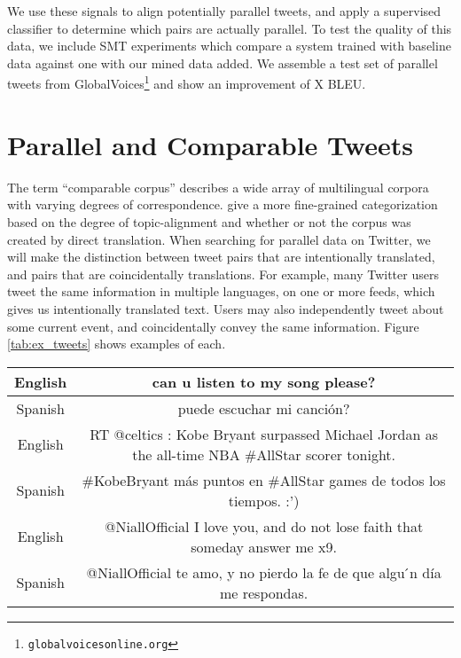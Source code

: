 We use these signals to align potentially parallel tweets, and apply a
supervised classifier \citep{Munteanu05} to determine which pairs are actually parallel.
To test the quality of this data, we include SMT experiments which compare a
system trained with baseline data against one with our mined data added. We
assemble a test set of parallel tweets from GlobalVoices\footnote{{\tt globalvoicesonline.org}}
and show an improvement of X BLEU.

\section{Parallel and Comparable Tweets}
The term ``comparable corpus'' describes a wide array of multilingual corpora with varying
degrees of correspondence. \citet{Fung04a} give a more fine-grained
categorization based on the degree of topic-alignment and whether or not the
corpus was created by direct translation. When searching for parallel data on
Twitter, we will make the distinction between tweet pairs that are intentionally
translated, and pairs that are coincidentally translations. For example, many
Twitter users tweet the same information in multiple languages, on one or more
feeds, which gives us intentionally translated text. Users may also
independently tweet about some current event, and coincidentally convey the same
information. Figure \ref{tab:ex_tweets} shows examples of each.

\begin{table*}
\begin{tabular}{|c|c|}
\hline
English & can u listen to my song please? \\
\hline
Spanish & puede escuchar mi canci\'{o}n? \\
\hline
\hline
English & RT @celtics : Kobe Bryant surpassed Michael Jordan as the all-time NBA
\#AllStar scorer tonight.\\
\hline
Spanish & \#KobeBryant m\'{a}s puntos en \#AllStar games de todos los tiempos. :')\\
\hline
\hline
English & @NiallOfficial I love you, and do not lose faith that someday answer
me x9.\\
\hline
Spanish & @NiallOfficial te amo, y no pierdo la fe de que algu ́n día me
respondas.\\
\hline
\end{tabular}
\caption{Examples of intentional and coincidental translations on Twitter. The
first pair of tweets came from the same author, the second contained the
same hashtag ({\tt \#AllStar}), and the third contained the same mention ({\tt
@NiallOfficial}).}
\label{tab:ex_tweets}
\end{table*}

